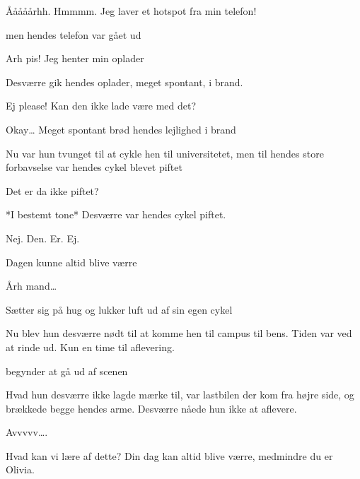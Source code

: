 \documentclass[a4paper,11pt]{article}
\begin{document}
\begin{sketch}
 Ååååårhh. Hmmmm. Jeg laver et hotspot fra min telefon! 

 men hendes telefon var gået ud

 Arh pis! Jeg henter min oplader

 Desværre gik hendes oplader, meget spontant, i brand. 

 Ej please! Kan den ikke lade være med det? 

 Okay… Meget spontant brød hendes lejlighed i brand





 Nu var hun tvunget til at cykle hen til universitetet, men til hendes store forbavselse var hendes cykel blevet piftet 

 Det er da ikke piftet? 

 *I bestemt tone* Desværre var hendes cykel piftet.

 Nej. Den. Er. Ej. 

 Dagen kunne altid blive værre

 Årh mand… 

 Sætter sig på hug og lukker luft ud af sin egen cykel

 Nu blev hun desværre nødt til at komme hen til campus til bens. Tiden var ved at 
rinde ud. Kun en time til aflevering. 

 begynder at gå ud af scenen

 Hvad hun desværre ikke lagde mærke til, var lastbilen der kom fra højre side, og brækkede begge hendes arme. Desværre nåede hun ikke at aflevere. 


 Avvvvv….

 Hvad kan vi lære af dette? Din dag kan altid blive værre, medmindre du er Olivia. 


\end{sketch}
\end{document}
